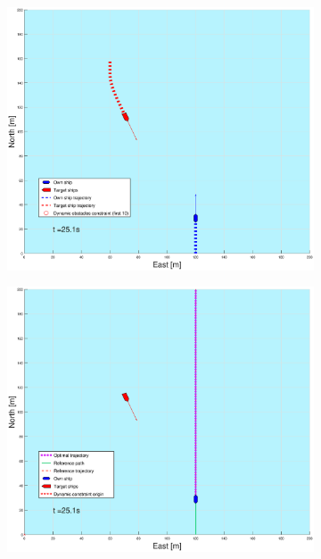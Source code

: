 \begin{figure}[!b]
\begin{subfigure}[b]{0.499\textwidth}
    \end{subfigure}
    \hfill
    \\
    \begin{subfigure}[b]{0.49\textwidth}
        \centering
        \includegraphics[width=\textwidth]{Images/Figures/sving_SO/_Simple_1fig1_time=25}
    \end{subfigure}
    \hfill
    \begin{subfigure}[b]{0.499\textwidth}
        \centering
        \includegraphics[width=\textwidth]{Images/Figures/sving_SO/_Simple_1fig999_time=25}

\end{subfigure}
\end{figure}
